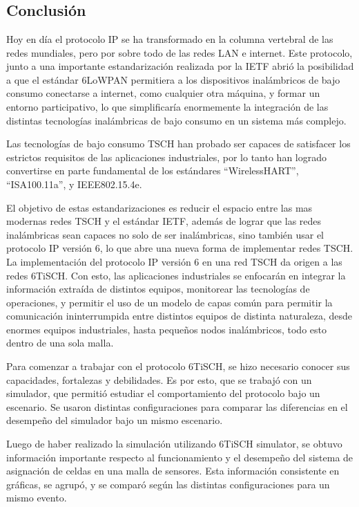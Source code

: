\chapter[]{}
\label{ch:conclu}

\section{Conclusión}

Hoy en día el protocolo IP se ha transformado en la columna vertebral de las redes mundiales, pero por sobre todo de las redes LAN e internet. Este protocolo, junto a una importante estandarización realizada por la IETF abrió la posibilidad a que el estándar 6LoWPAN permitiera a los dispositivos inalámbricos de bajo consumo conectarse a internet, como cualquier otra máquina, y formar un entorno participativo, lo que simplificaría enormemente la integración de las distintas tecnologías inalámbricas de bajo consumo en un sistema más complejo.

Las tecnologías de bajo consumo TSCH han probado ser capaces de satisfacer los estrictos requisitos de las aplicaciones industriales, por lo tanto han logrado convertirse en parte fundamental de los estándares “WirelessHART”, “ISA100.11a”, y IEEE802.15.4e.

El objetivo de estas estandarizaciones es reducir el espacio entre las mas modernas redes TSCH y el estándar IETF, además de lograr que las redes inalámbricas sean capaces no solo de ser inalámbricas, sino también usar el protocolo IP versión 6, lo que abre una nueva forma de implementar redes TSCH. La implementación del protocolo IP versión 6 en una red TSCH da origen a las redes 6TiSCH. Con esto, las aplicaciones industriales se enfocarán en integrar la información extraída de distintos equipos, monitorear las tecnologías de operaciones, y permitir el uso de un modelo de capas común para permitir la comunicación ininterrumpida entre distintos equipos de distinta naturaleza, desde enormes equipos industriales, hasta pequeños nodos inalámbricos, todo esto dentro de una sola malla.

Para comenzar a trabajar con el protocolo 6TiSCH, se hizo necesario conocer sus capacidades, fortalezas y debilidades. Es por esto, que se trabajó con un simulador, que permitió estudiar el comportamiento del protocolo bajo un escenario. Se usaron distintas configuraciones para comparar las diferencias en el desempeño del simulador bajo un mismo escenario.

Luego de haber realizado la simulación utilizando 6TiSCH simulator, se obtuvo información importante respecto al funcionamiento y el desempeño del sistema de asignación de celdas en una malla de sensores. Esta información consistente en gráficas, se agrupó, y se comparó según las distintas configuraciones para un mismo evento.


